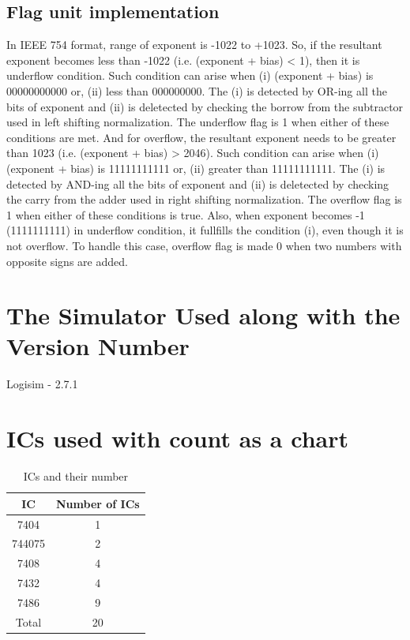 \documentclass[18pt]{article}
\begin{document}
\subsection{Flag unit implementation}
In IEEE 754 format, range of exponent is -1022 to +1023. So, if the resultant exponent becomes less than -1022 (i.e. (exponent + bias) < 1), then it is underflow condition. Such condition can arise when (i) (exponent + bias) is 00000000000 or, (ii) less than 000000000. The (i) is detected by OR-ing all the bits of exponent and (ii) is deletected by checking the borrow from the subtractor used in left shifting normalization. The underflow flag is 1 when either of these conditions are met. And for overflow, the resultant exponent needs to be greater than 1023 (i.e. (exponent + bias) > 2046). Such condition can arise when (i) (exponent + bias) is 11111111111 or, (ii) greater than 11111111111. The (i) is detected by AND-ing all the bits of exponent and (ii) is deletected by checking the carry from the adder used in right shifting normalization. The overflow flag is 1 when either of these conditions is true. Also, when exponent becomes -1 (1111111111) in underflow condition, it fullfills the condition (i), even though it is not overflow. To handle this case, overflow flag is made 0 when two numbers with opposite signs are added.

\section{The Simulator Used along with the Version Number}

\Large

Logisim - 2.7.1

\newpage

\section{ICs used with count as a chart}

\begin{table}[!h]
    \captionsetup{font=Large}
    \centering
    \begin{tabular}{||c|c||}
    \hline
        \textbf{IC} & \textbf{Number of ICs} \\
        \hline
        7404 & 1 \\
        744075 & 2 \\
        7408 & 4 \\
        7432 & 4 \\
        7486 & 9 \\
    \hline
    \hline
        Total & 20 \\
    \hline
    \end{tabular}
    \caption{ICs and their number}
    \label{tab:ic-number}
\end{table}
\end{document}
